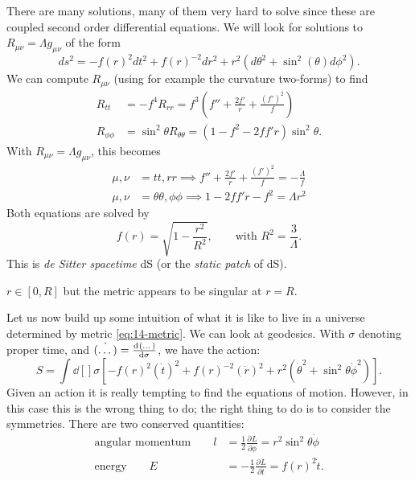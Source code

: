 There are many solutions, many of them very hard to solve since these are coupled second order differential equations. We will look for solutions to $R_{\mu\nu} = \Lambda g_{\mu\nu}$ of the form
\begin{equation}
  \label{eq:14-metric}
  ds^2 = -f(r)^2 dt^2 + f(r)^{-2} dr^2 + r^2 (d\theta^2 + \sin^2(\theta) d\phi^2).
\end{equation}
We can compute $R_{\mu\nu}$ (using for example the curvature two-forms) to find 
\begin{align}
  R_{t t } &= -f^4 R_{rr} = f^3 (f'' + \frac{2f'}{r} + \frac{(f')^2}{f}) \\
  R_{\phi\phi} &= \sin^2\theta R_{\theta\theta} = (1 - f^2 - 2 ff' r) \sin^2\theta.
\end{align}
With $R_{\mu\nu} = \Lambda g_{\mu\nu}$, this becomes
\begin{align}
  \mu,\nu &= t t, r r \implies f'' + \frac{2 f'}{r} + \frac{(f')^2}{f} = -\frac{\Lambda}{f}   \\
  \mu, \nu &= \theta\theta, \phi\phi \implies 1 - 2 ff' r - f^2 = \Lambda r^2
\end{align}
Both equations are solved by
\begin{equation}
  f(r) = \sqrt{1 - \frac{r^2}{R^2}}, \qquad \text{with } R^2 = \frac{3}{\Lambda}.
\end{equation}
This is \emph{de Sitter spacetime} dS (or the \emph{static patch} of dS).
\begin{leftbar}
  \begin{remark}
    $r\in [0, R]$ but the metric appears to be singular at $r = R$.
  \end{remark}
\end{leftbar}
Let us now build up some intuition of what it is like to live in a universe determined by metric \eqref{eq:14-metric}.
We can look at geodesics. With $\sigma$ denoting proper time, and $\dot{(\dots)} = \dv[]{(\dots)}{\sigma}$, we have the action:
\begin{equation}
  S = \int \dd[]{\sigma} \left[ -f(r)^2 (\dot t)^2 + f(r)^{-2} (\dot r)^2 + r^2 (\dot \theta^2 + \sin^2 \theta \dot \phi^2) \right].
\end{equation}
Given an action it is really tempting to find the equations of motion. However, in this case this is the wrong thing to do; the right thing to do is to consider the symmetries.
There are two conserved quantities: 
\begin{align}
  \text{angular momentum} \qquad l &= \frac{1}{2} \frac{\partial^{} L}{\partial \dot \phi} = r^2 \sin^2\theta \dot \phi \\
  \text{energy} \qquad E &= -\frac{1}{2} \frac{\partial^{} L}{\partial \dot t} = f(r)^2 \dot t.
\end{align}
